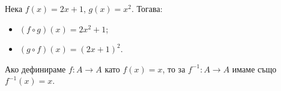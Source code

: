 \begin{example}
  Нека $f(x) = 2x+1$, $g(x) = x^2$. Тогава:
  \begin{itemize}
  \item 
    $(f\circ g)(x) = 2x^2 + 1$;
  \item
    $(g\circ f)(x) = (2x+1)^2$.
  \end{itemize}
\end{example}

\begin{example}
  Ако дефинираме $f:A\to A$ като $f(x) = x$, 
  то за $f^{-1}:A\to A$ имаме също $f^{-1}(x) = x$.
\end{example}

  





  
  






